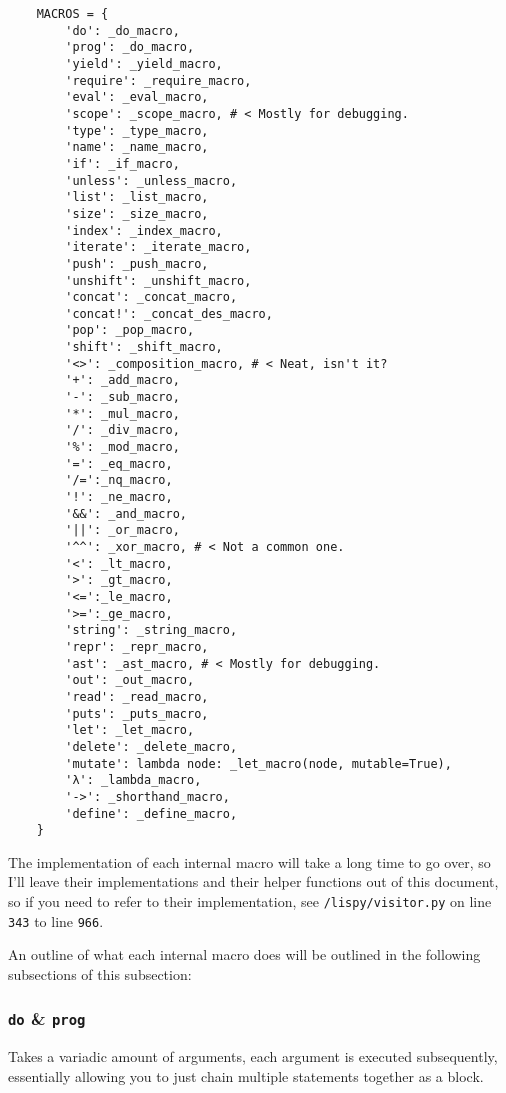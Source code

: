 \documentclass{article}
\newcommand{\code}[1]{\texttt{#1}}
\begin{document}
    \begin{verbatim}
    MACROS = {
        'do': _do_macro,
        'prog': _do_macro,
        'yield': _yield_macro,
        'require': _require_macro,
        'eval': _eval_macro,
        'scope': _scope_macro, # < Mostly for debugging.
        'type': _type_macro,
        'name': _name_macro,
        'if': _if_macro,
        'unless': _unless_macro,
        'list': _list_macro,
        'size': _size_macro,
        'index': _index_macro,
        'iterate': _iterate_macro,
        'push': _push_macro,
        'unshift': _unshift_macro,
        'concat': _concat_macro,
        'concat!': _concat_des_macro,
        'pop': _pop_macro,
        'shift': _shift_macro,
        '<>': _composition_macro, # < Neat, isn't it?
        '+': _add_macro,
        '-': _sub_macro,
        '*': _mul_macro,
        '/': _div_macro,
        '%': _mod_macro,
        '=': _eq_macro,
        '/=':_nq_macro,
        '!': _ne_macro,
        '&&': _and_macro,
        '||': _or_macro,
        '^^': _xor_macro, # < Not a common one.
        '<': _lt_macro,
        '>': _gt_macro,
        '<=':_le_macro,
        '>=':_ge_macro,
        'string': _string_macro,
        'repr': _repr_macro,
        'ast': _ast_macro, # < Mostly for debugging.
        'out': _out_macro,
        'read': _read_macro,
        'puts': _puts_macro,
        'let': _let_macro,
        'delete': _delete_macro,
        'mutate': lambda node: _let_macro(node, mutable=True),
        'λ': _lambda_macro,
        '->': _shorthand_macro,
        'define': _define_macro,
    }
    \end{verbatim}

    \clearpage

    The implementation of each internal macro will take a long time to go over,
    so I'll leave their implementations and their helper functions out of this
    document, so if you need to refer to their implementation, see
    \code{/lispy/visitor.py} on line \code{343} to line \code{966}.

    An outline of what each  internal macro does will be outlined in the
    following subsections of this subsection:

    \subsubsection{\code{do} \& \code{prog}}
      Takes a variadic amount of arguments, each argument is executed
      subsequently, essentially allowing you to just chain multiple
      statements together as a block.
\end{document}

